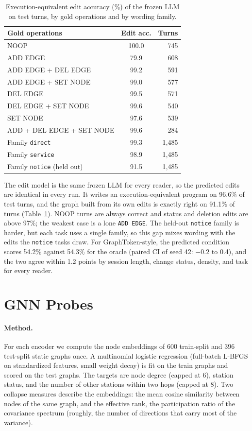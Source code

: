 \documentclass[11pt]{article}
\begin{document}
\begin{table}[t]
\centering
\small
\begin{tabular}{@{}lcr@{}}
\toprule
\textbf{Gold operations} & \textbf{Edit acc.} & \textbf{Turns} \\
\midrule
NOOP & 100.0 & 745 \\
ADD EDGE & 79.9 & 608 \\
ADD EDGE + DEL EDGE & 99.2 & 591 \\
ADD EDGE + SET NODE & 99.0 & 577 \\
DEL EDGE & 99.5 & 571 \\
DEL EDGE + SET NODE & 99.6 & 540 \\
SET NODE & 97.6 & 539 \\
ADD + DEL EDGE + SET NODE & 99.6 & 284 \\
\midrule
Family \texttt{direct} & 99.3 & 1{,}485 \\
Family \texttt{service} & 98.9 & 1{,}485 \\
Family \texttt{notice} (held out) & 91.5 & 1{,}485 \\
\bottomrule
\end{tabular}
\caption{Execution-equivalent edit accuracy (\%) of the frozen LLM on test turns, by gold operations and by wording family.}
\label{tab:write}
\end{table}

The edit model is the same frozen LLM for every reader, so the predicted edits are identical in every run.
It writes an execution-equivalent program on 96.6\% of test turns, and the graph built from its own edits is exactly right on 91.1\% of turns (Table~\ref{tab:write}).
NOOP turns are always correct and status and deletion edits are above 97\%; the weakest case is a lone \texttt{ADD EDGE}.
The held-out \texttt{notice} family is harder, but each task uses a single family, so this gap mixes wording with the edits the \texttt{notice} tasks draw.
For GraphToken-style, the predicted condition scores 54.2\% against 54.3\% for the oracle (paired CI of seed 42: $-0.2$ to 0.4), and the two agree within 1.2 points by session length, change status, density, and task for every reader.

\section{GNN Probes}
\label{app:probe}

\paragraph{Method.}
For each encoder we compute the node embeddings of 600 train-split and 396 test-split static graphs once.
A multinomial logistic regression (full-batch L-BFGS on standardized features, small weight decay) is fit on the train graphs and scored on the test graphs.
The targets are node degree (capped at 6), station status, and the number of other stations within two hops (capped at 8).
Two collapse measures describe the embeddings: the mean cosine similarity between nodes of the same graph, and the effective rank, the participation ratio of the covariance spectrum (roughly, the number of directions that carry most of the variance).
\end{document}

